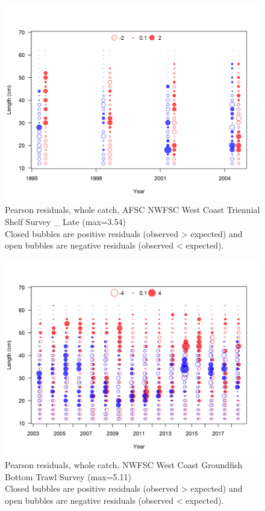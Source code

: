 \documentclass[12pt,]{article}
\begin{document}
\begin{figure}
\centering
\includegraphics{r4ss/plots_mod1/comp_lenfit_residsflt6mkt0.png}
\caption{Pearson residuals, whole catch, AFSC NWFSC West Coast Triennial
Shelf Survey \_ Late (max=3.54)\\
Closed bubbles are positive residuals (observed \textgreater{} expected)
and open bubbles are negative residuals (observed \textless{} expected).
\label{fig:tri_len_pearson}}
\end{figure}

\begin{figure}
\centering
\includegraphics{r4ss/plots_mod1/comp_lenfit_residsflt7mkt0.png}
\caption{Pearson residuals, whole catch, NWFSC West Coast Groundfish
Bottom Trawl Survey (max=5.11)\\
Closed bubbles are positive residuals (observed \textgreater{} expected)
and open bubbles are negative residuals (observed \textless{} expected).
\label{fig:nwfsc_combo_len_pearson}}
\end{figure}
\end{document}

